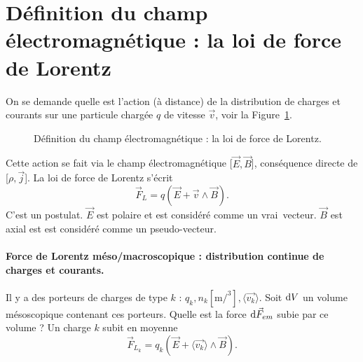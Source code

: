 \section[La loi de force de Lorentz]{Définition du champ électromagnétique : la loi de force de Lorentz}

    On se demande quelle est l'action (à distance) de la distribution de charges et courants sur une particule chargée $q$ de vitesse $\vec{v}$, voir la Figure~\ref{fig:definition_champ_em_loi_force_lorentz}.

    \begin{figure}
        \centering
        \caption{Définition du champ électromagnétique : la loi de force de Lorentz.}    
        \label{fig:definition_champ_em_loi_force_lorentz}
    \end{figure}

    Cette action se fait via le champ électromagnétique [$\vec{E},\vec{B}$], conséquence directe de [$\rho,\vec{j}$]. La loi de force de Lorentz s'écrit
    \begin{equation}
        \boxed{
            \vec{F}_L = q\left(\vec{E}+\vec{v}\wedge\vec{B}\right).
        }
    \end{equation}
    C'est un postulat. $\vec{E}$ est polaire et est considéré comme un \og vrai\fg~vecteur. $\vec{B}$ est axial est est considéré comme un \og pseudo-vecteur\fg.

    \paragraph{Force de Lorentz méso/macroscopique : distribution continue de charges et courants.}

        Il y a des porteurs de charges de type $k$ : $q_k,n_k [\si{\metre\per\cubed}],\langle\vec{v_k}\rangle$. Soit $\mathrm{d} V$ un volume mésoscopique contenant ces porteurs. Quelle est la force $\mathrm{d}\vec{F}_{em}$ subie par ce volume ? Un charge $k$ subit en moyenne 
        \begin{equation}
            \vec{F}_{L_k}=q_k\left(\vec{E}+\langle\vec{v_k}\rangle\wedge \vec{B}\right).
        \end{equation}

